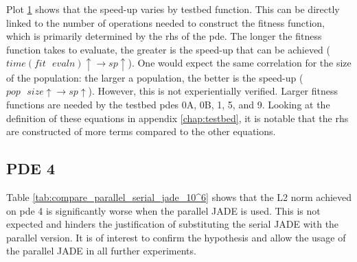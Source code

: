 \documentclass[./\jobname.tex]{subfiles}
\begin{document}
\begin{figure}[H]
	\centering
	\noindent{}
	\label{fig:serial_to_parallel_speedup}
\end{figure}

Plot \ref{fig:serial_to_parallel_speedup} shows that the speed-up varies by testbed function. This can be directly linked to the number of operations needed to construct the fitness function, which is primarily determined by the \gls{rhs} of the \gls{pde}. The longer the fitness function takes to evaluate, the greater is the speed-up that can be achieved ($time(fit \text{ } evaln) \uparrow \rightarrow sp \uparrow$). One would expect the same correlation for the size of the population: the larger a population, the better is the speed-up ($pop \text{ } size \uparrow \rightarrow sp \uparrow$). However, this is not experientially verified. Larger fitness functions are needed by the testbed \gls{pde}s 0A, 0B, 1, 5, and 9. Looking at the definition of these equations in appendix \ref{chap:testbed}, it is notable that the \gls{rhs} are constructed of more terms compared to the other equations. 

\subsection{PDE 4}

Table \ref{tab:compare_parallel_serial_jade_10^6} shows that the L2 norm achieved on \gls{pde} 4 is significantly worse when the parallel JADE is used. This is not expected and hinders the justification of substituting the serial JADE with the parallel version. It is of interest to confirm the hypothesis and allow the usage of the parallel JADE in all further experiments. 
\end{document}
